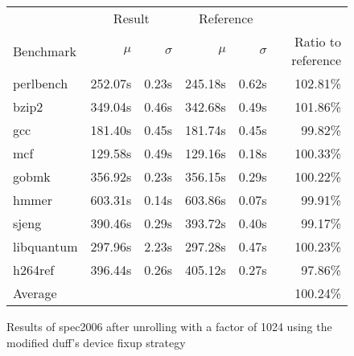 \begin{figure}[h]
    \begin{center}
        \begin{tabular}{lrrrrr}
            \toprule
            & \multicolumn{2}{c}{Result} & \multicolumn{2}{c}{Reference}\\
            Benchmark & $\mu$ & $\sigma$ & $\mu$ & $\sigma$ & Ratio to reference\\
            \midrule
            perlbench & 252.07s & 0.23s & 245.18s & 0.62s & 102.81\%\\
            bzip2 & 349.04s & 0.46s & 342.68s & 0.49s & 101.86\%\\
            gcc & 181.40s & 0.45s & 181.74s & 0.45s & 99.82\%\\
            mcf & 129.58s & 0.49s & 129.16s & 0.18s & 100.33\%\\
            gobmk & 356.92s & 0.23s & 356.15s & 0.29s & 100.22\%\\
            hmmer & 603.31s & 0.14s & 603.86s & 0.07s & 99.91\%\\
            sjeng & 390.46s & 0.29s & 393.72s & 0.40s & 99.17\%\\
            libquantum & 297.96s & 2.23s & 297.28s & 0.47s & 100.23\%\\
            h264ref & 396.44s & 0.26s & 405.12s & 0.27s & 97.86\%\\
            \midrule
            Average & & & & & 100.24\%\\
            \bottomrule
        \end{tabular}
    \end{center}
    \caption{Results of spec2006 after unrolling with a factor of 1024 using the modified duff's device fixup strategy}
    \label{fig:eval:perf:duff:1024}
\end{figure}